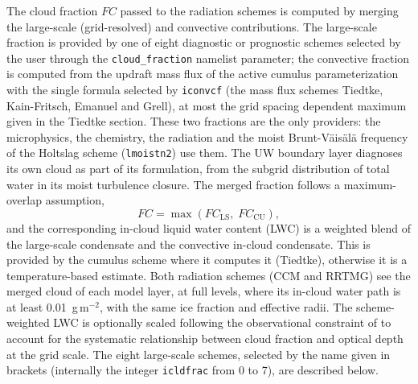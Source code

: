 {The cloud fraction $FC$ passed to the radiation schemes is computed by merging
the large-scale (grid-resolved) and convective contributions. The large-scale
fraction is provided by one of eight diagnostic or prognostic schemes selected
by the user through the \texttt{cloud\_fraction} namelist parameter; the
convective fraction is computed from the updraft mass flux of the active
cumulus parameterization with the single formula selected by
\texttt{iconvcf} (the mass flux schemes Tiedtke, Kain-Fritsch, Emanuel and
Grell), at most the grid spacing dependent
maximum given in the Tiedtke section. These two fractions are the only
providers: the microphysics, the chemistry, the radiation and the moist
Brunt-V\"ais\"al\"a frequency of the Holtslag scheme (\verb=lmoistn2=) use
them. The UW boundary layer diagnoses its own cloud as part of its
formulation, from the subgrid distribution of total water in its moist
turbulence closure. The merged
fraction follows a maximum-overlap assumption,
\begin{equation}
  FC = \max\!\left(FC_\mathrm{LS},\; FC_\mathrm{CU}\right),
\end{equation}
and the corresponding in-cloud liquid water content (LWC) is a weighted blend
of the large-scale condensate and the convective in-cloud condensate. This is
provided by the cumulus scheme where it computes it (Tiedtke), otherwise it is
a temperature-based estimate. Both radiation schemes (CCM and RRTMG) see
the merged cloud of each model layer, at full levels, where its in-cloud water
path is at least 0.01~g\,m$^{-2}$, with the same ice fraction and effective
radii. The scheme-weighted LWC is optionally scaled following the
observational constraint of \citet{Liang_05} to account for the systematic
relationship between cloud fraction and optical depth at the grid scale.
The eight large-scale schemes, selected by the name given in brackets
(internally the integer \texttt{icldfrac} from 0 to 7), are described
below.\\

\noindent{
\begin{enumerate}
\setcounter{enumi}{-1}


\end{enumerate}}}
